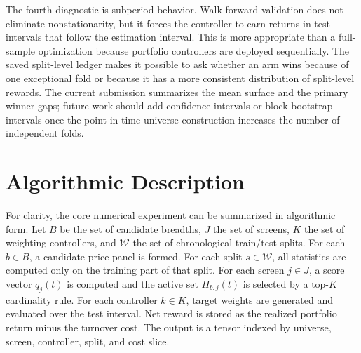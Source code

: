 \documentclass[journal,10pt]{IEEEtran}
\begin{document}
The fourth diagnostic is subperiod behavior. Walk-forward validation does not eliminate nonstationarity, but it forces the controller to earn returns in test intervals that follow the estimation interval. This is more appropriate than a full-sample optimization because portfolio controllers are deployed sequentially. The saved split-level ledger makes it possible to ask whether an arm wins because of one exceptional fold or because it has a more consistent distribution of split-level rewards. The current submission summarizes the mean surface and the primary winner gaps; future work should add confidence intervals or block-bootstrap intervals once the point-in-time universe construction increases the number of independent folds.

\section{Algorithmic Description}
For clarity, the core numerical experiment can be summarized in algorithmic form. Let $B$ be the set of candidate breadths, $J$ the set of screens, $K$ the set of weighting controllers, and $\mathcal{W}$ the set of chronological train/test splits. For each $b\in B$, a candidate price panel is formed. For each split $s\in\mathcal{W}$, all statistics are computed only on the training part of that split. For each screen $j\in J$, a score vector $q_j(t)$ is computed and the active set $H_{b,j}(t)$ is selected by a top-$K$ cardinality rule. For each controller $k\in K$, target weights are generated and evaluated over the test interval. Net reward is stored as the realized portfolio return minus the turnover cost. The output is a tensor indexed by universe, screen, controller, split, and cost slice.
\end{document}
